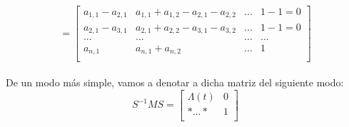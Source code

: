 \documentclass[14pt]{extarticle}
\begin{document}
     \[= \begin{bmatrix}
     a_{1,1}-a_{2,1} & a_{1,1}+a_{1,2}-a_{2,1}-a_{2,2} & ... & 1-1 = 0  \\
     a_{2,1}-a_{3,1} & a_{2,1}+a_{2,2}-a_{3,1}-a_{3,2}&... & 1 - 1=0  \\
     ... & ... & ... & ... \\	
     a_{n,1} & a_{n,1}+a_{n,2} & ... & 1 \\
     \end{bmatrix}\]\\
     
     De un modo más simple, vamos a denotar a dicha matriz del siguiente modo:\\
     \[ S^{-1}MS = \left[\begin{array}{r|r}
     \Lambda (t) & 0 \\ \hline	
     * ... * & 1\\
     \end{array}\right]\]\\
  
\end{document}
